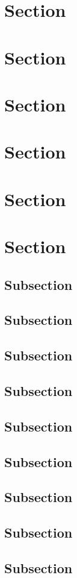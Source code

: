{{{{\section{Section}
\section{Section}
\section{Section}
\section{Section}
\section{Section}
\section{Section}
\subsection{Subsection}
\label{ssec:example}
\lipsum
\subsection{Subsection}
\subsection{Subsection}
\subsection{Subsection}
\subsection{Subsection}
\subsection{Subsection}
\subsection{Subsection}
\subsection{Subsection}
\subsection{Subsection}
}}}}
